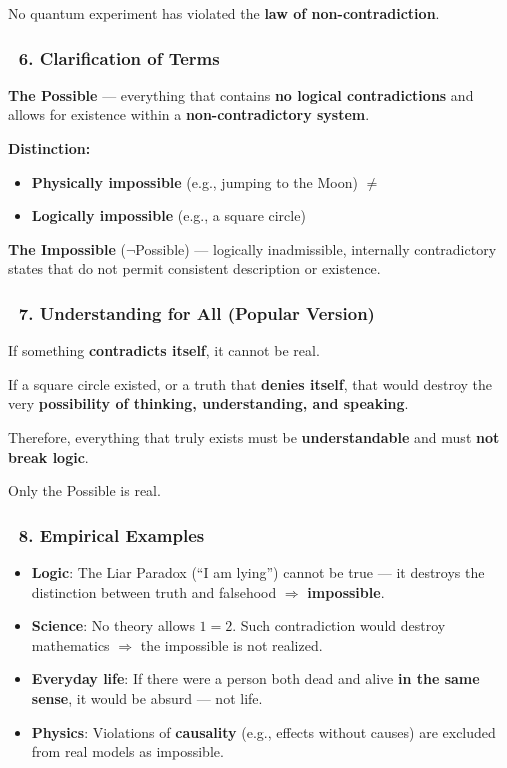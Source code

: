 \documentclass[12pt]{article}
\begin{document}
No quantum experiment has violated the \textbf{law of non-contradiction}.

\subsubsection*{🔹 6. Clarification of Terms}
\textbf{The Possible} — everything that contains \textbf{no logical contradictions} and allows for existence within a \textbf{non-contradictory system}.

\textbf{Distinction:}
\begin{itemize}
\item \textbf{Physically impossible} (e.g., jumping to the Moon) $\neq$
\item \textbf{Logically impossible} (e.g., a square circle)
\end{itemize}

\textbf{The Impossible} ($\neg$Possible) — logically inadmissible, internally contradictory states that do not permit consistent description or existence.

\subsubsection*{🔹 7. Understanding for All (Popular Version)}
If something \textbf{contradicts itself}, it cannot be real.

If a square circle existed, or a truth that \textbf{denies itself}, that would destroy the very \textbf{possibility of thinking, understanding, and speaking}.

Therefore, everything that truly exists must be \textbf{understandable} and must \textbf{not break logic}.

Only the Possible is real.

\subsubsection*{🔹 8. Empirical Examples}
\begin{itemize}
\item \textbf{Logic}: The Liar Paradox (``I am lying'') cannot be true — it destroys the distinction between truth and falsehood 
$\Rightarrow$ \textbf{impossible}.
\item \textbf{Science}: No theory allows $1 = 2$. Such contradiction would destroy mathematics $\Rightarrow$ the impossible is not realized.
\item \textbf{Everyday life}: If there were a person both dead and alive \textbf{in the same sense}, it would be absurd — not life.
\item \textbf{Physics}: Violations of \textbf{causality} (e.g., effects without causes) are excluded from real models as impossible.
\end{itemize}
\end{document}
